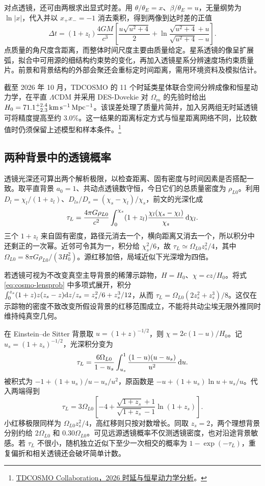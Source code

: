 对点透镜，还可由两根求出显式时差。用 $\theta/\theta_E=x$、$\beta/\theta_E=u$，无量纲势为 $\ln|x|$，代入并以 $x_+x_-=-1$ 消去乘积，得到两像到达时差的正值
\[
 \Delta t=(1+z_l)\frac{4GM}{c^3}
 \left[\frac{u\sqrt{u^2+4}}2+
 \ln\frac{\sqrt{u^2+4}+u}{\sqrt{u^2+4}-u}\right].
\]
点质量的角尺度含距离，而整体时间尺度主要由质量给定。星系透镜的像呈扩展弧，拟合中可用源的细结构约束势的变化，再加入透镜星系分辨速度场约束质量片。前景和背景结构的外部会聚还会重标定时间距离，需用环境资料及模拟估计。

截至 2026 年 10 月，TDCOSMO 的 11 个时延类星体联合空间分辨成像和恒星动力学，在平直 $\Lambda$CDM 并采用 DES-Dovekie 对 $\Omega_m$ 的先验时给出 $H_0=71.1^{+2.4}_{-2.3}\,{\rm km\,s^{-1}\,Mpc^{-1}}$。该误差处理了质量片简并，加入另两组无时延透镜可将精度提高至约 $3.0\%$。这一结果的距离标定方式与恒星距离网络不同，比较数值时仍须保留上述模型和样本条件。\footnote{\href{https://arxiv.org/abs/2610.14781}{TDCOSMO Collaboration，2026 时延与恒星动力学分析}。}

\subsection{两种背景中的透镜概率}

透镜光深还可算出两个解析极限，以检查距离、固有密度与时间因素是否搭配一致。取平直背景 $a_0=1$、共动点透镜数守恒，今日它们的总质量密度为 $\rho_{L0}$。利用 $D_l=\chi_l/(1+z_l)$、$D_{ls}/D_s=(\chi_s-\chi_l)/\chi_s$，前文的光深化成
\begin{equation}\label{eq:cosmo-lensprob}
 \tau_L=\frac{4\pi G\rho_{L0}}{c^2}
    \int_0^{\chi_s}(1+z_l)
          \frac{\chi_l(\chi_s-\chi_l)}{\chi_s}\,\dd\chi_l .
\end{equation}
三个 $1+z_l$ 来自固有密度，路径元消去一个，横向距离又消去一个，所以积分中还剩正的一次幂。近邻可令其为一，积分给 $\chi_s^2/6$，故 $\tau_L\simeq\Omega_{L0}z_s^2/4$，其中 $\Omega_{L0}=8\pi G\rho_{L0}/(3H_0^2)$。源红移加倍，局域近似下光深增为四倍。

若透镜可视为不改变真空主导背景的稀薄示踪物，$H=H_0$、$\chi=cz/H_0$。将式 \eqref{eq:cosmo-lensprob} 中多项式展开，积分 $\int_0^{z_s}(1+z)z(z_s-z)\dd z/z_s=z_s^2/6+z_s^3/12$，从而 $\tau_L=\Omega_{L0}(2z_s^2+z_s^3)/8$。这仅在示踪物的密度不致改变所假设背景的红移范围成立，不能将共动尘埃无限外推同时维持纯真空几何。

在 Einstein--de Sitter 背景取 $u=(1+z)^{-1/2}$，则 $\chi=2c(1-u)/H_0$。记 $u_s=(1+z_s)^{-1/2}$，光深积分变为
\[
 \tau_L=\frac{6\Omega_{L0}}{1-u_s}
       \int_{u_s}^1\frac{(1-u)(u-u_s)}{u^2}\,\dd u .
\]
被积式为 $-1+(1+u_s)/u-u_s/u^2$，原函数是 $-u+(1+u_s)\ln u+u_s/u$。代入两端得到
\[
 \tau_L=3\Omega_{L0}
    \left[-4+\frac{\sqrt{1+z_s}+1}{\sqrt{1+z_s}-1}\ln(1+z_s)\right].
\]
小红移极限同样为 $\Omega_{L0}z_s^2/4$，高红移则只按对数增长。同取 $z_s=2$，两个理想背景分别约给 $2\Omega_{L0}$ 和 $0.30\Omega_{L0}$。可见远源透镜概率不仅测透镜密度，也对沿途背景敏感。若 $\tau_L$ 不很小，随机独立近似下至少一次相交的概率为 $1-\exp(-\tau_L)$，重复偏折和相关透镜还会破坏简单计数。

